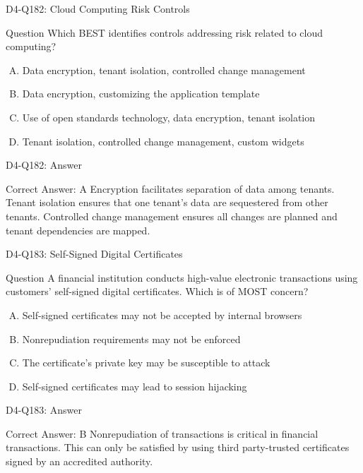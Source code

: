 \documentclass{beamer}
\begin{document}
	\begin{frame}{D4-Q182: Cloud Computing Risk Controls}
		\begin{block}{Question}
			Which BEST identifies controls addressing risk related to cloud computing?
		\end{block}
		\begin{enumerate}[(A)]
			\item Data encryption, tenant isolation, controlled change management
			\item Data encryption, customizing the application template
			\item Use of open standards technology, data encryption, tenant isolation
			\item Tenant isolation, controlled change management, custom widgets
		\end{enumerate}
	\end{frame}
	\begin{frame}{D4-Q182: Answer}
		\begin{block}{Correct Answer: A}
			Encryption facilitates separation of data among tenants. Tenant isolation ensures that one tenant's data are sequestered from other tenants. Controlled change management ensures all changes are planned and tenant dependencies are mapped.
		\end{block}
	\end{frame}
	
	\begin{frame}{D4-Q183: Self-Signed Digital Certificates}
		\begin{block}{Question}
			A financial institution conducts high-value electronic transactions using customers' self-signed digital certificates. Which is of MOST concern?
		\end{block}
		\begin{enumerate}[(A)]
			\item Self-signed certificates may not be accepted by internal browsers
			\item Nonrepudiation requirements may not be enforced
			\item The certificate's private key may be susceptible to attack
			\item Self-signed certificates may lead to session hijacking
		\end{enumerate}
	\end{frame}
	\begin{frame}{D4-Q183: Answer}
		\begin{block}{Correct Answer: B}
			Nonrepudiation of transactions is critical in financial transactions. This can only be satisfied by using third party-trusted certificates signed by an accredited authority.
		\end{block}
	\end{frame}
	
\end{document}
